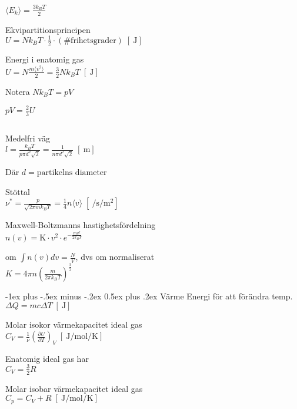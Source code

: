 \documentclass[10pt,landscape]{article}
\makeatletter
\newcommand{\unit}[1]{
\;[\SI{}{#1}]
}
\renewcommand{\section}{\@startsection{section}{1}{0mm}%
                                {-1ex plus -.5ex minus -.2ex}%
                                {0.5ex plus .2ex}%
                                {\normalfont\large\bfseries}
                                }
\makeatother
\begin{document}
\begin{multicols}{5}
$\langle E_k \rangle = \frac{3k_BT}{2}$

Ekvipartitionsprincipen\\
$U = Nk_BT \cdot \frac{1}{2} \cdot (\# \text{frihetsgrader}) \unit{\joule}$ 


Energi i enatomig gas\\
$U = N \frac{m \langle v^2 \rangle}{2} = \frac{3}{2} Nk_BT \unit{\joule}$ 


Notera $Nk_BT = pV$

$pV = \frac{2}{3}U$

$$$$

Medelfri väg\\
$l = \frac{k_BT}{p \pi d^2 \sqrt{2}} = \frac{1}{n \pi d^2 \sqrt{2}} \unit{\meter}$  


Där $d = \text{partikelns diameter}$



Stöttal\\
$\nu^* = \frac{p}{\sqrt{2 \pi mk_BT}} = \frac{1}{4}n \langle v \rangle \unit{\per\second \per\square\meter}$ 


Maxwell-Boltzmanns hastighetsfördelning\\
$\displaystyle n(v) = \text{K} \cdot v^2 \cdot e^{-\frac{mv^2}{2k_BT}}$ 

om $\int n(v) dv = \frac{N}{V}$, dvs om normaliserat\\
$K = 4\pi n \left(\frac{m}{2\pi k_B T} \right)^\frac{3}{2}$ 


\section{Värme}
Energi för att förändra temp.\\
$\Delta Q = m c \Delta T \unit{\joule}$ 


Molar isokor värmekapacitet ideal gas\\
$C_V = \frac{1}{\nu} \left ( \frac{\partial U}{\partial T} \right)_V \unit{\joule\per\mol\per\kelvin}$ 


Enatomig ideal gas har\\
$C_V = \frac{3}{2}R$

Molar isobar värmekapacitet ideal gas\\
$C_p = C_V + R \unit{\joule\per\mol\per\kelvin}$ 


\end{multicols}
\end{document}
